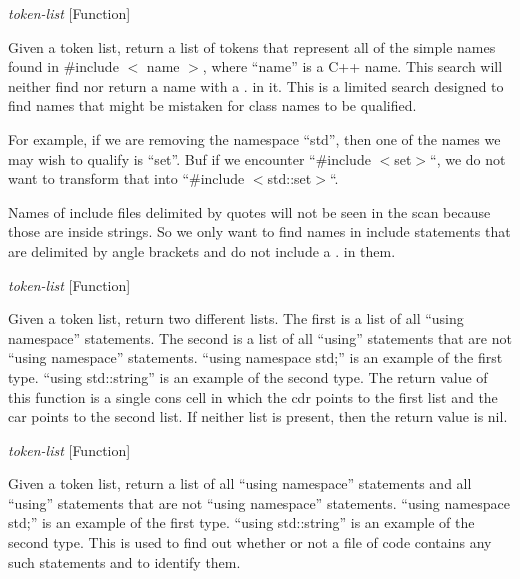 \vspace{1em}
\noindent
{}
\usebox{\funcname}\emph{token-list}
 \hfill [Function]

\begin{doc-string}
Given a token list, return a list of tokens that represent all of the simple
names found in \#include $<$ name $>$, where ``name'' is a C++ name.  This search
will neither find nor return a name with a . in it.  This is a limited search
designed to find names that might be mistaken for class names to be qualified.

For example, if we are removing the namespace ``std'', then one of the names we
may wish to qualify is ``set''.  Buf if we encounter ``\#include $<$set$>$``, we do
not want to transform that into ``\#include $<$std::set$>$``.

Names of include files delimited by quotes will not be seen in the scan because
those are inside strings.  So we only want to find names in include statements
that are delimited by angle brackets and do not include a . in them.
\end{doc-string}

\vspace{1em}
\noindent
{}
\usebox{\funcname}\emph{token-list}
 \hfill [Function]

\begin{doc-string}
Given a token list, return two different lists.  The first is a list of all
``using namespace'' statements.  The second is a list of all ``using''
statements that are not ``using namespace'' statements.  ``using namespace
std;'' is an example of the first type.  ``using std::string'' is an example of
the second type.
The return value of this function is a single cons cell in which the cdr points
to the first list and the car points to the second list.
If neither list is present, then the return value is nil.
\end{doc-string}

\vspace{1em}
\noindent
{}
\usebox{\funcname}\emph{token-list}
 \hfill [Function]

\begin{doc-string}
Given a token list, return a list of all ``using namespace'' statements and
all ``using'' statements that are not ``using namespace'' statements.  ``using
namespace std;'' is an example of the first type.  ``using std::string'' is an
example of the second type.  This is used to find out whether or not a file of
code contains any such statements and to identify them.
\end{doc-string}

